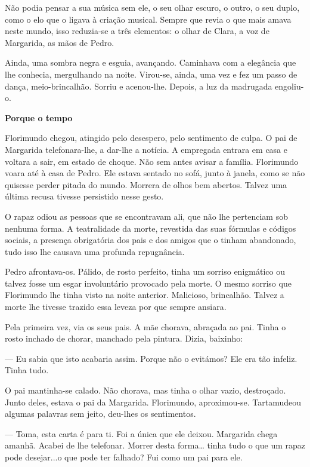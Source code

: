 Não podia pensar a sua música sem ele, o seu olhar escuro, o outro, o
seu duplo, como o elo que o ligava à criação musical. Sempre que revia o
que mais amava neste mundo, isso reduzia-se a três elementos: o olhar de
Clara, a voz de Margarida, as mãos de Pedro.

Ainda, uma sombra negra e esguia, avançando. Caminhava com a elegância
que lhe conhecia, mergulhando na noite. Virou-se, ainda, uma vez e fez
um passo de dança, meio-brincalhão. Sorriu e acenou-lhe. Depois, a luz
da madrugada engoliu-o.

\vspace*{1.8cm}
\noindent{}\textbf{Porque o tempo}

Florimundo chegou, atingido pelo desespero, pelo sentimento de culpa. O
pai de Margarida telefonara-lhe, a dar-lhe a notícia. A empregada
entrara em casa e voltara a sair, em estado de choque. Não sem antes
avisar a família. Florimundo voara até à casa de Pedro. Ele estava
sentado no sofá, junto à janela, como se não quisesse perder pitada do
mundo. Morrera de olhos bem abertos. Talvez uma última recusa tivesse
persistido nesse gesto.

O rapaz odiou as pessoas que se encontravam ali, que não lhe pertenciam
sob nenhuma forma. A teatralidade da morte, revestida das suas fórmulas
e códigos sociais, a presença obrigatória dos pais e dos amigos que o
tinham abandonado, tudo isso lhe causava uma profunda repugnância.

Pedro afrontava-os. Pálido, de rosto perfeito, tinha um sorriso
enigmático ou talvez fosse um esgar involuntário provocado pela morte. O
mesmo sorriso que Florimundo lhe tinha visto na noite anterior.
Malicioso, brincalhão. Talvez a morte lhe tivesse trazido essa leveza
por que sempre ansiara.

Pela primeira vez, via os seus pais. A mãe chorava, abraçada ao pai.
Tinha o rosto inchado de chorar, manchado pela pintura. Dizia, baixinho:

--- Eu sabia que isto acabaria assim. Porque não o evitámos? Ele era tão
infeliz. Tinha tudo.

O pai mantinha-se calado. Não chorava, mas tinha o olhar vazio,
destroçado. Junto deles, estava o pai da Margarida. Florimundo,
aproximou-se. Tartamudeou algumas palavras sem jeito, deu-lhes os
sentimentos.

--- Toma, esta carta é para ti. Foi a única que ele deixou. Margarida
chega amanhã. Acabei de lhe telefonar. Morrer desta forma\ldots{} tinha
tudo o que um rapaz pode desejar...o que pode ter falhado? Fui como um
pai para ele.

